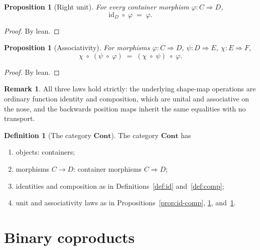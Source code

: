 \documentclass[11pt,a4paper]{article}
\theoremstyle{plain}
\newtheorem{proposition}[theorem]{Proposition}
\theoremstyle{definition}
\newtheorem{definition}[theorem]{Definition}
\newtheorem{remark}[theorem]{Remark}
\newcommand{\id}{\mathrm{id}}
\newcommand{\Cont}{\mathbf{Cont}}
\begin{document}
\begin{proposition}[Right unit]\label{prop:comp-id}
For every container morphism $\varphi:C\Rightarrow D$,
\begin{equation}
  \id_D \;\circ\; \varphi \;=\; \varphi.
\end{equation}
\end{proposition}

\begin{proof}
By lean.
\end{proof}

\begin{proposition}[Associativity]\label{prop:assoc}
For morphisms $\varphi:C\Rightarrow D$, $\psi:D\Rightarrow E$,
$\chi:E\Rightarrow F$,
\begin{equation}
  \chi \;\circ\; (\psi \;\circ\; \varphi)
  \;=\;
  (\chi \;\circ\; \psi) \;\circ\; \varphi.
\end{equation}
\end{proposition}

\begin{proof}
By lean.
\end{proof}

\begin{remark}
All three laws hold strictly: the underlying shape-map operations are ordinary
function identity and composition, which are unital and associative on the
nose, and the backwards position maps inherit the same equalities with no
transport.
\end{remark}

\begin{definition}[The category $\Cont$]\label{def:cont}
The category $\Cont$ has
\begin{enumerate}
  \item objects: containers;
  \item morphisms $C\to D$: container morphisms $C\Rightarrow D$;
  \item identities and composition as in Definitions~\ref{def:id}
        and~\ref{def:comp};
  \item unit and associativity laws as in Propositions~\ref{prop:id-comp},
        \ref{prop:comp-id}, and~\ref{prop:assoc}.
\end{enumerate}
\end{definition}

\section{Binary coproducts}
\end{document}
